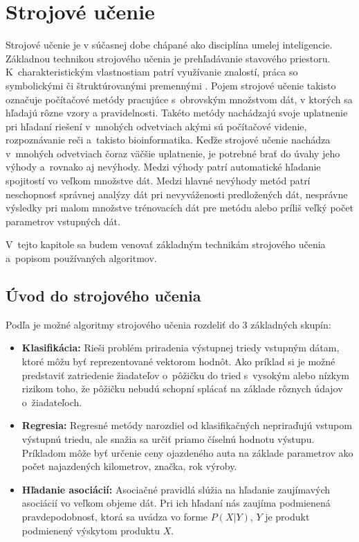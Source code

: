 \chapter{Strojové učenie}
\label{ml}
Strojové učenie je v súčasnej dobe chápané ako disciplína umelej inteligencie. Základnou technikou strojového učenia je prehľadávanie stavového priestoru. K~charakteristickým vlastnostiam patrí využívanie znalostí, práca so symbolickými či štruktúrovanými premennými \cite{machine_learning}. Pojem strojové učenie takisto označuje počítačové metódy pracujúce s~obrovským množstvom dát, v ktorých sa hľadajú rôzne vzory a pravidelnosti. Takéto metódy nachádzajú svoje uplatnenie pri hľadaní riešení v~mnohých odvetviach akými sú počítačové videnie, rozpoznávanie reči a~takisto bioinformatika. Keďže strojové učenie nachádza v~mnohých odvetviach čoraz väčšie uplatnenie, je potrebné brať do úvahy jeho výhody a~rovnako aj nevýhody. Medzi výhody patrí automatické hľadanie spojitostí vo veľkom množstve dát. Medzi hlavné nevýhody metód patrí neschopnosť správnej analýzy dát pri nevyváženosti predložených dát, nesprávne výsledky pri malom množstve trénovacích dát pre metódu alebo príliš veľký počet parametrov vstupných dát.

V~tejto kapitole sa budem venovať základným technikám strojového učenia a~popisom používaných algoritmov. 

\section{Úvod do strojového učenia}

Podľa \cite{alpaydin} je možné algoritmy strojového učenia rozdeliť do 3 základných skupín:
\begin{itemize}
	\item \textbf{Klasifikácia:} Rieši problém priradenia výstupnej triedy vstupným dátam, ktoré môžu byť reprezentované vektorom hodnôt. Ako príklad si je možné predstaviť zatriedenie žiadateľov o~pôžičku do tried s~vysokým alebo nízkym rizikom toho, že pôžičku nebudú schopní splácať na základe rôznych údajov o~žiadateľoch.
	\item \textbf{Regresia:} Regresné metódy narozdiel od klasifikačných nepriraďujú vstupom výstupnú triedu, ale snažia sa určiť priamo číselnú hodnotu výstupu. Príkladom môže byť určenie ceny ojazdeného auta na základe parametrov ako počet najazdených kilometrov, značka, rok výroby.
	\item \textbf{Hľadanie asociácií:} Asociačné pravidlá slúžia na hľadanie zaujímavých asociácií vo veľkom objeme dát. Pri ich hľadaní nás zaujíma podmienená pravdepodobnosť, ktorá sa uvádza vo forme $P(X|Y)$, $Y$ je produkt podmienený výskytom produktu $X$. 
\end{itemize}

